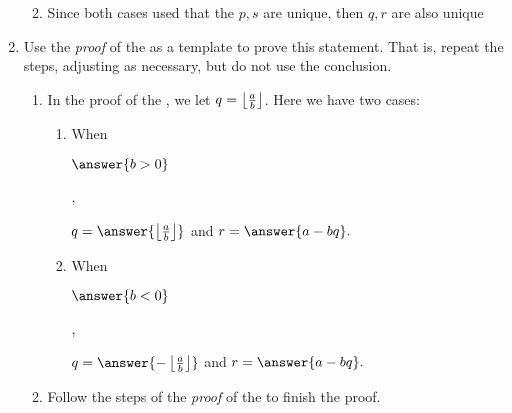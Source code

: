 \documentclass{../ximera}
\begin{document}
\begin{br}
\begin{enumerate}
\begin{enumerate}
\begin{enumerate}
      		\end{enumerate}
      		\item Since both cases used that the $p,s$ are unique, then $q,r$ are also unique
	\end{enumerate}
    	\item Use the \emph{proof} of the  as a template to prove this statement. That is, repeat the steps, adjusting as necessary, but do not use the conclusion.
    	\begin{enumerate}
    		\item In the proof of the , we let $q=\left\lfloor \frac{a}{b}\right\rfloor$. Here we have two cases:
    		\begin{enumerate}
      			\item When 
				\begin{prompt}
					$\answer{b>0}$
				\end{prompt}, 
				\begin{prompt}
					$q=\answer{\floor{\frac{a}{b}}}$ and $r=\answer{a-bq}.$
				\end{prompt}

      			\item When 
				\begin{prompt}
					$\answer{b<0}$
				\end{prompt}, 
				\begin{prompt}
					$q=\answer{-\floor{\frac{a}{b}}}$ and $r=\answer{a-bq}.$
				\end{prompt}
		\end{enumerate}
    		\item Follow the steps of the \emph{proof} of the  to finish the proof.
    	\end{enumerate}

\end{enumerate}


\end{br}
\end{document}
